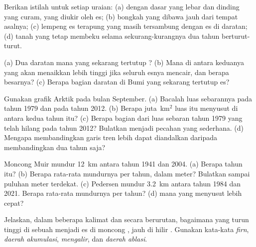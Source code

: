 \begin{exercise}[$\star$]\label{exo:g8:ice-on-earth:3}
Berikan istilah untuk setiap uraian: (a)  dengan dasar yang lebar
dan dinding yang curam, yang diukir oleh es; (b) bongkah yang dibawa
 jauh dari tempat asalnya; (c) lempeng es terapung yang masih
tersambung dengan es di daratan; (d) tanah yang tetap membeku selama
sekurang-kurangnya dua tahun berturut-turut.
\end{exercise}

\begin{exercise}[$\star$]\label{exo:g8:ice-on-earth:4}
(a) Dua daratan mana yang sekarang tertutup ? (b) Mana di antara
keduanya yang akan menaikkan  lebih tinggi jika seluruh
esnya mencair, dan berapa besarnya? (c) Berapa bagian daratan di Bumi
yang sekarang tertutup es?
\end{exercise}

\begin{exercise}[$\star\star$]\label{exo:g8:ice-on-earth:5}
Gunakan grafik  Arktik pada bulan September. (a) Bacalah luas
sebarannya pada tahun 1979 dan pada tahun 2012. (b) Berapa juta~km$^2$
luas itu menyusut di antara kedua tahun itu? (c) Berapa bagian dari luas
sebaran tahun 1979 yang telah hilang pada tahun 2012? Bulatkan menjadi
pecahan yang sederhana. (d) Mengapa membandingkan garis tren lebih dapat
diandalkan daripada membandingkan dua tahun saja?
\end{exercise}

\begin{exercise}[$\star\star$]\label{exo:g8:ice-on-earth:6}
Moncong  Muir mundur \qty{12}{km} antara tahun 1941 dan 2004.
(a) Berapa tahun itu? (b) Berapa rata-rata mundurnya per tahun, dalam
meter? Bulatkan sampai puluhan meter terdekat. (c)  Pedersen mundur
\qty{3.2}{km} antara tahun 1984 dan 2021. Berapa rata-rata mundurnya per
tahun? (d)  mana yang menyusut lebih cepat?
\end{exercise}

\begin{exercise}[$\star\star$]\label{exo:g8:ice-on-earth:7}
Jelaskan, dalam beberapa kalimat dan secara berurutan, bagaimana 
yang turun tinggi di sebuah  menjadi es di moncong , jauh di
hilir . Gunakan kata-kata \emph{firn}, \emph{daerah akumulasi},
\emph{mengalir}, dan \emph{daerah ablasi}.
\end{exercise}

